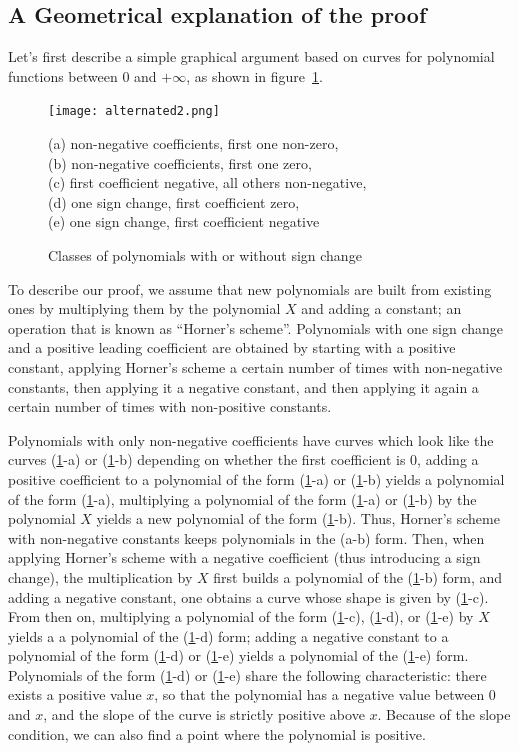 \documentclass{mscs}
\begin{document}
\subsection{A Geometrical explanation of the proof}
Let's first describe a simple graphical argument based on curves for
polynomial functions between 0 and \(+\infty\), as shown in
figure~\ref{graph-desc}.
\begin{figure}
\begin{center}
\texttt{[image: alternated2.png]}
\end{center}
{(a) non-negative coefficients, first one non-zero,\\
(b) non-negative coefficients, first one zero,\\
(c) first coefficient negative, all others non-negative,\\
(d) one sign change, first coefficient zero,\\
(e) one sign change, first coefficient negative}

\caption{\label{graph-desc}
Classes of polynomials with or without
sign change}
\end{figure}
To describe our proof, we assume that new polynomials are built from
existing ones by multiplying them by the polynomial \(X\) and adding a
constant; an operation that is known as ``Horner's scheme''.
Polynomials with one sign change and a positive leading coefficient
are obtained by starting with a positive constant, applying Horner's
scheme a certain number of times with non-negative constants, then
applying it a negative constant, and then applying it again a certain
number of times with non-positive constants.

Polynomials with only non-negative coefficients have curves which look
like the curves (\ref{graph-desc}-a) or (\ref{graph-desc}-b) depending on whether the first
coefficient is 0, adding a positive coefficient to a polynomial of the
form (\ref{graph-desc}-a) or (\ref{graph-desc}-b) yields a polynomial of the form (\ref{graph-desc}-a), multiplying a
polynomial of the form (\ref{graph-desc}-a) or (\ref{graph-desc}-b) by the polynomial \(X\) yields a new
polynomial of the form (\ref{graph-desc}-b).  Thus, Horner's scheme with non-negative
constants keeps polynomials in the (a-b) form.  Then, when applying
Horner's scheme with a negative coefficient (thus introducing a sign
change), the multiplication by \(X\) first builds a polynomial of the
(\ref{graph-desc}-b) form, and adding a negative constant, one obtains a curve whose
shape is given by (\ref{graph-desc}-c).  From then on, multiplying a polynomial of the
form (\ref{graph-desc}-c), (\ref{graph-desc}-d), or (\ref{graph-desc}-e) by \(X\) yields a a polynomial of the (\ref{graph-desc}-d) form; adding a
negative constant to a polynomial of the form (\ref{graph-desc}-d) or (\ref{graph-desc}-e) yields a
polynomial of the (\ref{graph-desc}-e) form.  Polynomials of the form (\ref{graph-desc}-d) or (\ref{graph-desc}-e)
share the following characteristic: there exists a positive value
\(x\), so that the polynomial has a negative value between 0 and
\(x\), and the slope of the curve is strictly positive above
\(x\).  Because of the slope condition, we can also find a point where
the polynomial is positive.
\end{document}
